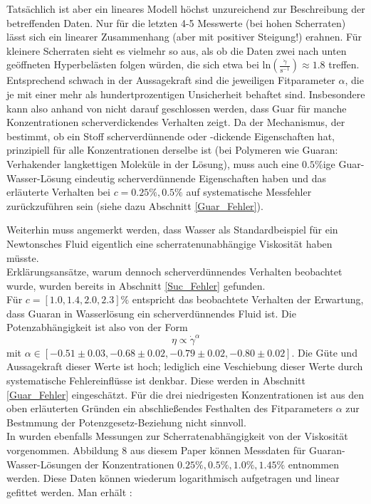 \documentclass[11pt,a4paper,oneside]{scrartcl}
\begin{document}
Tatsächlich ist aber ein lineares Modell höchst unzureichend zur Beschreibung der betreffenden Daten. Nur für die letzten 4-5 Messwerte (bei hohen Scherraten) lässt sich ein linearer Zusammenhang (aber mit positiver Steigung!) erahnen.  Für kleinere Scherraten sieht es vielmehr so aus, als ob die Daten zwei nach unten geöffneten Hyperbelästen folgen würden, die sich etwa bei $\mathrm{ln}\left(\frac{\dot\gamma}{\mathrm{s}^{-1}}\right)\approx 1.8$ treffen. 
Entsprechend schwach in der Aussagekraft sind die jeweiligen Fitparameter $\alpha$, die je mit einer mehr als hundertprozentigen Unsicherheit behaftet sind. Insbesondere kann also anhand von  nicht darauf geschlossen werden, dass Guar für manche Konzentrationen scherverdickendes Verhalten zeigt. Da der Mechanismus, der bestimmt, ob ein Stoff scherverdünnende oder -dickende Eigenschaften hat, prinzipiell für alle Konzentrationen derselbe ist (bei Polymeren wie Guaran: \glqq Verhaken\Grqq der langkettigen Moleküle in der Lösung), muss auch eine $0.5\%$ige Guar-Wasser-Lösung eindeutig scherverdünnende Eigenschaften haben und das erläuterte Verhalten bei $c=0.25\%,0.5\%$ auf systematische Messfehler zurückzuführen sein (siehe dazu Abschnitt \ref{Guar_Fehler}).\par
Weiterhin muss angemerkt werden, dass Wasser als Standardbeispiel für ein Newtonsches Fluid eigentlich eine scherratenunabhängige Viskosität haben müsste. \\ Erklärungsansätze, warum dennoch scherverdünnendes Verhalten beobachtet wurde, wurden bereits in Abschnitt \ref{Suc_Fehler} gefunden.\\
Für $c=[1.0,1.4,2.0,2.3]\%$ entspricht das beobachtete Verhalten der Erwartung, dass Guaran in Wasserlösung ein scherverdünnendes Fluid ist. Die Potenzabhängigkeit ist also von der Form \begin{equation}\eta\propto\dot\gamma^\alpha\end{equation} mit $\alpha\in[-0.51\pm0.03,-0.68\pm0.02,-0.79\pm0.02,-0.80\pm0.02]$. Die Güte und Aussagekraft dieser Werte ist hoch; lediglich eine Veschiebung dieser Werte durch systematische Fehlereinflüsse ist denkbar. Diese werden in Abschnitt \ref{Guar_Fehler} eingeschätzt. Für die drei niedrigesten Konzentrationen ist aus den oben erläuterten Gründen ein abschließendes Festhalten des Fitparameters $\alpha$ zur Bestmmung der Potenzgesetz-Beziehung nicht sinnvoll. \\
In \cite{rheology_guar_gum} wurden ebenfalls Messungen zur Scherratenabhängigkeit von der Viskosität vorgenommen. Abbildung 8 aus diesem Paper können Messdaten für Guaran-Wasser-Lösungen der Konzentrationen $0.25\%,0.5\%,1.0\%,1.45\%$ entnommen werden. Diese Daten können wiederum logarithmisch aufgetragen und linear gefittet werden. Man erhält :
\end{document}

